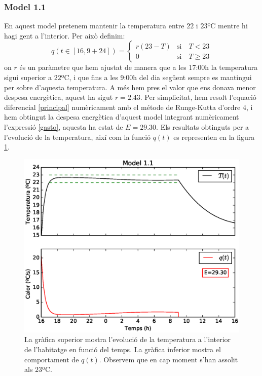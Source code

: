 \documentclass[11pt]{article}
\begin{document}
	\subsubsection*{Model 1.1}
	En aquest model pretenem mantenir la temperatura entre $22$ i $23$ºC mentre hi hagi gent a l'interior. Per això definim:
	\begin{equation}\label{model11}
	 q(t\in[16,9+24])=
		\begin{cases}
		r(23-T)&\text{si}\quad T<23\\
		0&\text{si}\quad T\geq23
		
		\end{cases}
	\end{equation}
	on $r$ és un paràmetre que hem ajustat de manera que a les 17:00h la temperatura sigui superior a $22$ºC, i que fins a les 9:00h del dia següent sempre es mantingui per sobre d'aquesta temperatura. A més hem pres el valor que ens donava menor despesa energètica, aquest ha sigut $r=2.43$. Per simplicitat, hem resolt l'equació diferencial \eqref{principal} numèricament amb el métode de Runge-Kutta d'ordre 4, i hem  obtingut la despesa energètica d'aquest model integrant numèricament l'expressió \eqref{gasto}, aquesta ha estat de $E=29.30$. Els resultats obtinguts per a l'evolució de la temperatura, així com la funció $q(t)$ es representen en la figura \ref{figmodel11}. 
	\begin{figure}[h!]
		\centering
		\includegraphics[width=12cm]{model11.eps}
		\caption{La gràfica superior mostra l'evolució de la temperatura a l'interior de l'habitatge en funció del temps. La gràfica inferior mostra el comportament de $q(t)$. Observem que en cap moment s'han assolit als $23$ºC.}
		\label{figmodel11}
	\end{figure}
\end{document}
